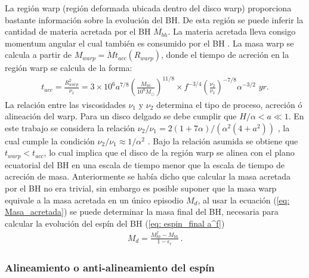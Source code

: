 La región warp (región deformada ubicada dentro del disco warp) proporciona bastante información sobre la evolución del BH. De esta región se puede inferir la cantidad de materia acretada por el BH $\dot{M_{bh}}$. La materia acretada lleva consigo momentum angular el cual también es consumido por el BH
\cite{volonteri2007}. La masa warp se calcula a partir de $M_{warp}=\dot{M}t_{acc}(R_{warp})$, donde el tiempo de acreción en la región warp se calcula de la forma:
%
\begin{align}
 t_{acc}=\frac{R^{2}_{warp}}{\nu_{1}} = 3 \times10^{6}a^{7/8} \left(\frac{M_{bh}}{10^{8}M_{\odot}} \right)^{11/8}\times f^{-3/4}\left( \frac{\nu_{2}}{\nu_{1}}\right)^{-7/8}\alpha^{-3/2}\,\, \textit{yr}.
\end{align}
%
La relación entre las viscosidades $\nu_1$ y $\nu_2$ determina el tipo de proceso, acreción ó alineación del warp. Para un disco delgado se debe cumplir que $H/\alpha < a \ll 1$. En este trabajo se considera la relación $\nu_{2}/\nu_{1}=2(1+7\alpha)/(\alpha^{2}(4+a^{2}))$ \cite{ogilvie1999} , la cual cumple la condición $\nu_{2}/\nu_{1}\approx 1/\alpha^{2}$ \cite{papaloizou1983}. Bajo la relación asumida se obtiene que $t_{warp}< t_{acc}$, lo cual implica que el disco de la región warp se alinea con el plano ecuatorial del BH en una escala de tiempo menor que la escala de tiempo de acreción de masa. Anteriormente se había dicho que calcular la masa acretada por el BH no era trivial, sin embargo es posible suponer que la masa warp equivale a la masa acretada en un único episodio $M_{d}$, al usar la ecuación (\ref{eq: Masa_acretada}) \cite{Bustamante2018b} se puede determinar la masa final del BH, necesaria para calcular la evolución del espín del BH (\ref{eq: espin_final a^f})
%
\begin{align}
 M_{d}= \frac{M_{bh}^{f}-M_{bh}}{1-\epsilon_{r}}\,.
 \label{eq: Masa_acretada}
\end{align}
%
    \subsubsection{Alineamiento o anti-alineamiento del espín}
    \label{subsubsec: Aling_Spin}

